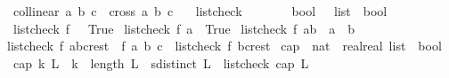 \begin{isabellebody}
\ \ {\isachardoublequoteopen}collinear{}\ a\ b\ c\ {\isasymequiv}\ cross{}\ a\ b\ c\ {\isacharequal}{\kern0pt}\ {}{\isachardoublequoteclose}\isanewline
\isanewline
\isanewline
\isanewline
{}\isamarkupfalse%
\ list{\isacharunderscore}{\kern0pt}check\ {\isacharcolon}{\kern0pt}{\isacharcolon}{\kern0pt}\ {\isachardoublequoteopen}{\isacharparenleft}{\kern0pt}{\isacharunderscore}{\kern0pt}\ {\isasymRightarrow}\ {\isacharunderscore}{\kern0pt}\ {\isasymRightarrow}\ {\isacharunderscore}{\kern0pt}\ {\isasymRightarrow}\ bool{\isacharparenright}{\kern0pt}\ {\isasymRightarrow}\ {\isacharunderscore}{\kern0pt}\ list\ {\isasymRightarrow}\ bool{\isachardoublequoteclose}\ \isanewline
\ \ {\isachardoublequoteopen}list{\isacharunderscore}{\kern0pt}check\ f\ {\isacharbrackleft}{\kern0pt}{\isacharbrackright}{\kern0pt}\ {\isacharequal}{\kern0pt}\ True{\isachardoublequoteclose}\isanewline
{\isacharbar}{\kern0pt}\ {\isachardoublequoteopen}list{\isacharunderscore}{\kern0pt}check\ f\ {\isacharparenleft}{\kern0pt}a{\isacharhash}{\kern0pt}{\isacharbrackleft}{\kern0pt}{\isacharbrackright}{\kern0pt}{\isacharparenright}{\kern0pt}\ {\isacharequal}{\kern0pt}\ True{\isachardoublequoteclose}\isanewline
{\isacharbar}{\kern0pt}\ {\isachardoublequoteopen}list{\isacharunderscore}{\kern0pt}check\ f\ {\isacharparenleft}{\kern0pt}a{\isacharhash}{\kern0pt}b{\isacharhash}{\kern0pt}{\isacharbrackleft}{\kern0pt}{\isacharbrackright}{\kern0pt}{\isacharparenright}{\kern0pt}\ {\isacharequal}{\kern0pt}\ {\isacharparenleft}{\kern0pt}a\ {\isasymnoteq}\ b{\isacharparenright}{\kern0pt}{\isachardoublequoteclose}\isanewline
{\isacharbar}{\kern0pt}\ {\isachardoublequoteopen}list{\isacharunderscore}{\kern0pt}check\ f\ {\isacharparenleft}{\kern0pt}a{\isacharhash}{\kern0pt}b{\isacharhash}{\kern0pt}c{\isacharhash}{\kern0pt}rest{\isacharparenright}{\kern0pt}\ {\isacharequal}{\kern0pt}\ {\isacharparenleft}{\kern0pt}f\ a\ b\ c\ {\isasymand}\ list{\isacharunderscore}{\kern0pt}check\ f\ {\isacharparenleft}{\kern0pt}b{\isacharhash}{\kern0pt}c{\isacharhash}{\kern0pt}rest{\isacharparenright}{\kern0pt}{\isacharparenright}{\kern0pt}{\isachardoublequoteclose}\isanewline
\isanewline
\isanewline
{}\isamarkupfalse%
\ cap\ {\isacharcolon}{\kern0pt}{\isacharcolon}{\kern0pt}\ {\isachardoublequoteopen}nat\ {\isasymRightarrow}\ {\isacharparenleft}{\kern0pt}real{\isasymtimes}real{\isacharparenright}{\kern0pt}\ list\ {\isasymRightarrow}\ bool{\isachardoublequoteclose}\ \isanewline
\ \ {\isachardoublequoteopen}cap\ k\ L\ {\isasymequiv}\ {\isacharparenleft}{\kern0pt}k\ {\isacharequal}{\kern0pt}\ length\ L{\isacharparenright}{\kern0pt}\ {\isasymand}\ {\isacharparenleft}{\kern0pt}sdistinct\ L{\isacharparenright}{\kern0pt}\ {\isasymand}\ {\isacharparenleft}{\kern0pt}list{\isacharunderscore}{\kern0pt}check\ cap{}\ L{\isacharparenright}{\kern0pt}{\isachardoublequoteclose}\isanewline

\end{isabellebody}
